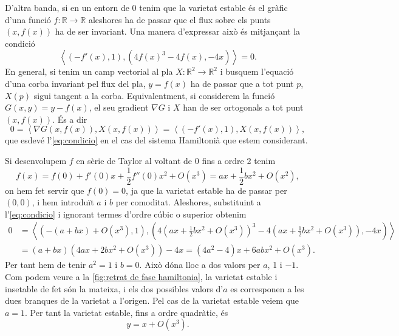 \documentclass[12pt]{article}
\newcommand{\R}{\mathbb{R}}
\newcommand{\inn}[2]{\left\langle #1 , #2 \right\rangle}
\begin{document}
\begin{enumerate}[label=(\roman*), font=\bfseries \sffamily, wide, labelwidth=!, labelindent=0pt]
		D'altra banda, si en un entorn de 0 tenim que la varietat estable és el gràfic d'una funció \( f \colon \R \to \R \) aleshores ha de passar que el flux sobre els punts \( (x, f(x)) \) ha de ser invariant. Una manera d'expressar això és mitjançant la condició
		\begin{equation} \label{eq:condicio}
			\inn{(-f'(x), 1)}{(4f(x)^3 - 4f(x), -4x)} = 0.
		\end{equation}
		En general, si tenim un camp vectorial al pla \( X \colon \R^2 \to \R^2 \) i busquem l'equació d'una corba invariant pel flux del pla, \( y = f(x) \) ha de passar que a tot punt \( p \), \( X(p) \) sigui tangent a la corba. Equivalentment, si considerem la funció \( G(x,y) = y - f(x) \), el seu gradient \( \nabla G \) i \( X \) han de ser ortogonals a tot punt \( (x, f(x)) \). És a dir
		\begin{equation*}
			0 = \inn{\nabla G(x, f(x))}{X(x, f(x))} = \inn{(-f'(x), 1)}{X(x, f(x))},
		\end{equation*}
		que esdevé l'\cref{eq:condicio} en el cas del sistema Hamiltonià que estem considerant.

		Si desenvolupem \( f \) en sèrie de Taylor al voltant de \( 0 \) fins a ordre 2 tenim
		\begin{equation*}
			f(x) = f(0) + f'(0)x + \frac{1}{2}f''(0)x^2 + O(x^3) = ax + \frac{1}{2}bx^2 + O(x^2),
		\end{equation*}
		on hem fet servir que \( f(0) = 0 \), ja que la varietat estable ha de passar per \( (0,0) \), i hem introduït \( a \) i \( b \) per comoditat. Aleshores, substituint a l'\cref{eq:condicio} i ignorant termes d'ordre cúbic o superior obtenim
		\begin{align*}
			0 & = \inn{(-(a + bx) + O(x^3), 1)}{\left(4\left(ax + \tfrac{1}{2}bx^2 + O(x^3)\right)^3 - 4\left(ax + \tfrac{1}{2}bx^2 + O(x^3)\right), -4x\right)} \\
				& = (a + bx)(4ax + 2bx^2 + O(x^3)) - 4x = (4a^2 - 4)x + 6abx^2 + O(x^3).
		\end{align*}
		Per tant hem de tenir \( a^2 = 1 \) i \( b = 0 \). Això dóna lloc a dos valors per \( a \), 1 i \( -1 \). Com podem veure a la \cref{fig:retrat de fase hamiltonia}, la varietat estable i insetable de fet són la mateixa, i els dos possibles valors d'\( a \) es corresponen a les dues branques de la varietat a l'origen. Pel cas de la varietat estable veiem que \( a  = 1 \). Per tant la varietat estable, fins a ordre quadràtic, és
		\begin{equation*}
			y = x + O(x^3). 
		\end{equation*}


\end{enumerate}
\end{document}
